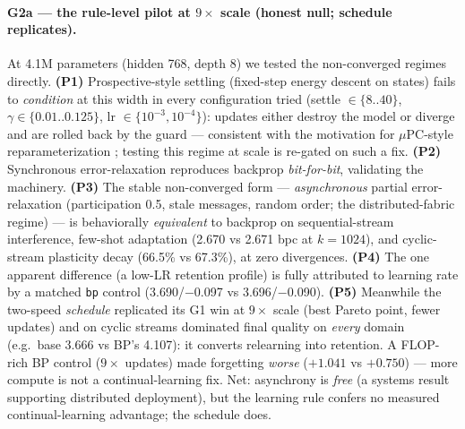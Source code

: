 \documentclass[11pt]{article}
\begin{document}
\paragraph{G2a --- the rule-level pilot at $9\times$ scale (honest null; schedule replicates).}
At 4.1M parameters (hidden 768, depth 8) we tested the non-converged regimes directly.
\textbf{(P1)} Prospective-style settling (fixed-step energy descent on states) fails to
\emph{condition} at this width in every configuration tried (settle $\in\{8..40\}$,
$\gamma\in\{0.01..0.125\}$, lr $\in\{10^{-3},10^{-4}\}$): updates either destroy the model or
diverge and are rolled back by the guard --- consistent with the motivation for $\mu$PC-style
reparameterization \citep{mupc2025}; testing this regime at scale is re-gated on such a fix.
\textbf{(P2)} Synchronous error-relaxation reproduces backprop \emph{bit-for-bit}, validating
the machinery. \textbf{(P3)} The stable non-converged form --- \emph{asynchronous} partial
error-relaxation (participation 0.5, stale messages, random order; the distributed-fabric
regime) --- is behaviorally \emph{equivalent} to backprop on sequential-stream interference,
few-shot adaptation (2.670 vs 2.671 bpc at $k{=}1024$), and cyclic-stream plasticity decay
(66.5\% vs 67.3\%), at zero divergences. \textbf{(P4)} The one apparent difference (a low-LR
retention profile) is fully attributed to learning rate by a matched \texttt{bp} control
(3.690/$-$0.097 vs 3.696/$-$0.090). \textbf{(P5)} Meanwhile the two-speed \emph{schedule}
replicated its G1 win at $9\times$ scale (best Pareto point, fewer updates) and on cyclic
streams dominated final quality on \emph{every} domain (e.g.\ base 3.666 vs BP's 4.107):
it converts relearning into retention. A FLOP-rich BP control ($9\times$ updates) made
forgetting \emph{worse} ($+1.041$ vs $+0.750$) --- more compute is not a continual-learning
fix. Net: asynchrony is \emph{free} (a systems result supporting distributed deployment), but
the learning rule confers no measured continual-learning advantage; the schedule does.
\end{document}
